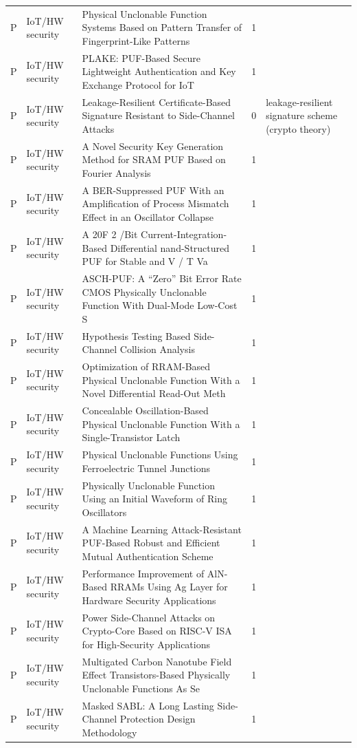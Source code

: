\documentclass[10pt]{article}
\begin{document}
\begin{longtable}{@{}llL{8.6cm}lL{4.2cm}@{}}
P & IoT/HW security & Physical Unclonable Function Systems Based on Pattern Transfer of Fingerprint-Like Patterns & 1 &  \\
P & IoT/HW security & PLAKE: PUF-Based Secure Lightweight Authentication and Key Exchange Protocol for IoT & 1 &  \\
P & IoT/HW security & Leakage-Resilient Certificate-Based Signature Resistant to Side-Channel Attacks & 0 & leakage-resilient signature scheme (crypto theory) \\
P & IoT/HW security & A Novel Security Key Generation Method for SRAM PUF Based on Fourier Analysis & 1 &  \\
P & IoT/HW security & A BER-Suppressed PUF With an Amplification of Process Mismatch Effect in an Oscillator Collapse & 1 &  \\
P & IoT/HW security & A 20F 2 /Bit Current-Integration-Based Differential nand-Structured PUF for Stable and V / T Va & 1 &  \\
P & IoT/HW security & ASCH-PUF: A “Zero” Bit Error Rate CMOS Physically Unclonable Function With Dual-Mode Low-Cost S & 1 &  \\
P & IoT/HW security & Hypothesis Testing Based Side-Channel Collision Analysis & 1 &  \\
P & IoT/HW security & Optimization of RRAM-Based Physical Unclonable Function With a Novel Differential Read-Out Meth & 1 &  \\
P & IoT/HW security & Concealable Oscillation-Based Physical Unclonable Function With a Single-Transistor Latch & 1 &  \\
P & IoT/HW security & Physical Unclonable Functions Using Ferroelectric Tunnel Junctions & 1 &  \\
P & IoT/HW security & Physically Unclonable Function Using an Initial Waveform of Ring Oscillators & 1 &  \\
P & IoT/HW security & A Machine Learning Attack-Resistant PUF-Based Robust and Efficient Mutual Authentication Scheme & 1 &  \\
P & IoT/HW security & Performance Improvement of AlN-Based RRAMs Using Ag Layer for Hardware Security Applications & 1 &  \\
P & IoT/HW security & Power Side-Channel Attacks on Crypto-Core Based on RISC-V ISA for High-Security Applications & 1 &  \\
P & IoT/HW security & Multigated Carbon Nanotube Field Effect Transistors-Based Physically Unclonable Functions As Se & 1 &  \\
P & IoT/HW security & Masked SABL: A Long Lasting Side-Channel Protection Design Methodology & 1 &  \\

\end{longtable}
\end{document}
